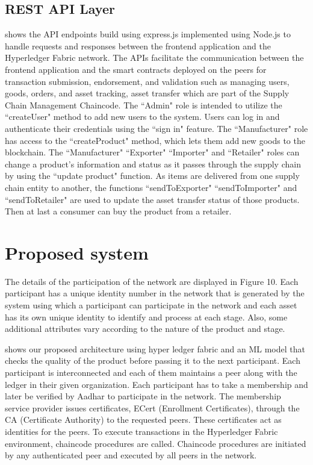 \subsection{REST API Layer}
\noindent shows the API endpoints build using express.js implemented using Node.js to handle requests and responses between the frontend application and the Hyperledger Fabric network. The APIs facilitate the communication between the frontend application and the smart contracts deployed on the peers for transaction submission, endorsement, and validation such as managing users, goods, orders, and asset tracking, asset transfer which are part of the Supply Chain Management Chaincode.
The ``Admin" role is intended to utilize the ``createUser" method to add new users to the system. Users can log in and authenticate their credentials using the ``sign in" feature.
The ``Manufacturer" role has access to the ``createProduct" method, which lets them add new goods to the blockchain. The ``Manufacturer" ``Exporter" ``Importer" and ``Retailer" roles can change a product's information and status as it passes through the supply chain by using the ``update product" function.
As items are delivered from one supply chain entity to another, the functions ``sendToExporter" ``sendToImporter" and ``sendToRetailer" are used to update the asset transfer status of those products.
Then at last a consumer can buy the product from a retailer.

\section{Proposed system}

\noindent The details of the participation of the network are displayed in Figure 10. Each participant has a unique identity number in the network that is generated by the system using which a participant can participate in the network and each asset has its own unique identity to identify and process at each stage. Also, some additional attributes vary according to the nature of the product and stage.


\noindent shows our proposed architecture using hyper ledger fabric and an ML model that checks the quality of the product before passing it to the next participant. Each participant is interconnected and each of them maintains a peer along with the ledger in their given organization. Each participant has to take a membership and later be verified by Aadhar to participate in the network. The membership service provider issues certificates, ECert (Enrollment Certificates), through the CA (Certificate Authority) to the requested peers. These certificates act as identities for the peers. To execute transactions in the Hyperledger Fabric environment, chaincode procedures are called. Chaincode procedures are initiated by any authenticated peer and executed by all peers in the network.

